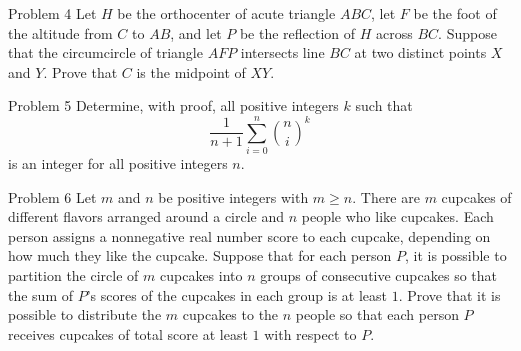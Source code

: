 \begin{problem}{Problem 4}
    Let $H$ be the orthocenter of acute triangle $ABC$, let $F$ be the foot of the altitude from $C$ to $AB$, and let $P$ be the reflection of $H$ across $BC$. Suppose that the circumcircle of triangle $AFP$ intersects line $BC$ at two distinct points $X$ and $Y$. Prove that $C$ is the midpoint of $XY$.
\end{problem}

\begin{problem}{Problem 5}
Determine, with proof, all positive integers $k$ such that$$\frac{1}{n+1} \sum_{i=0}^n \binom{n}{i}^k$$is an integer for all positive integers $n.$
\end{problem}

\begin{problem}{Problem 6}
    Let $m$ and $n$ be positive integers with $m\geq n$. There are $m$ cupcakes of different flavors arranged around a circle and $n$ people who like cupcakes. Each person assigns a nonnegative real number score to each cupcake, depending on how much they like the cupcake. Suppose that for each person $P$, it is possible to partition the circle of $m$ cupcakes into $n$ groups of consecutive cupcakes so that the sum of $P$'s scores of the cupcakes in each group is at least $1$. Prove that it is possible to distribute the $m$ cupcakes to the $n$ people so that each person $P$ receives cupcakes of total score at least $1$ with respect to $P$.
\end{problem}